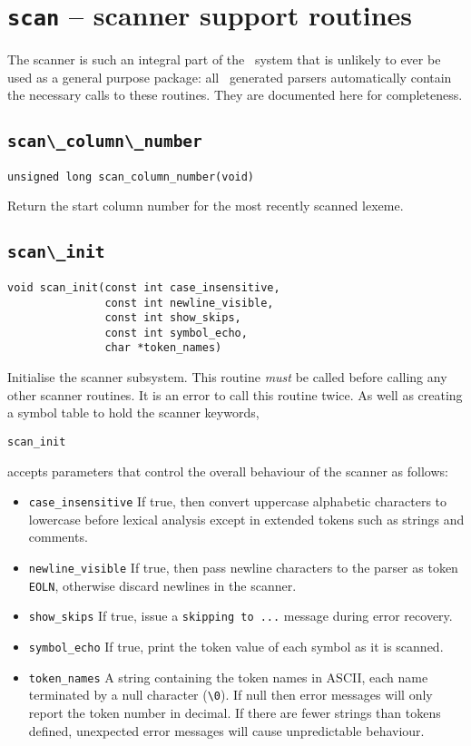 \chapter{{\tt scan} -- scanner support routines}

The scanner is such an integral part of the \rdp\ system that is
unlikely to ever be used as a general purpose package: all \rdp\
generated parsers automatically contain the necessary calls to these
routines. They are documented here for completeness.

\section{\protect\verb+scan\_column\_number+}
\begin{verbatim}
unsigned long scan_column_number(void)
\end{verbatim}
Return the start column number for the most recently scanned lexeme.

\section{\protect\verb+scan\_init+}
\begin{verbatim}
void scan_init(const int case_insensitive, 
               const int newline_visible, 
               const int show_skips, 
               const int symbol_echo, 
               char *token_names)
\end{verbatim}
Initialise the scanner subsystem. This routine {\em must} be called
before calling any other scanner routines. It is an error to call this
routine twice.
As well as creating a symbol table to hold the scanner keywords,
\begin{verbatim}
scan_init
\end{verbatim}
accepts parameters that control the overall behaviour of the scanner as
follows:
\begin{itemize}
\item \verb+case_insensitive+
If true, then convert uppercase alphabetic characters to lowercase
before lexical analysis except in extended tokens such as strings and
comments.

\item \verb+newline_visible+
If true, then pass newline characters to the parser as token
\verb+EOLN+, otherwise discard newlines in the scanner.
 
\item \verb+show_skips+
If true, issue a {\tt skipping to ...} message during error recovery.

\item \verb+symbol_echo+
If true, print the token value of each symbol as it is scanned.

\item \verb+token_names+
A string containing the token names in ASCII, each name terminated by a
null character (\verb+\0+). If null then error messages will only report
the token number in decimal. If there are fewer strings than tokens defined,
unexpected error messages will cause unpredictable behaviour.
\end{itemize}

